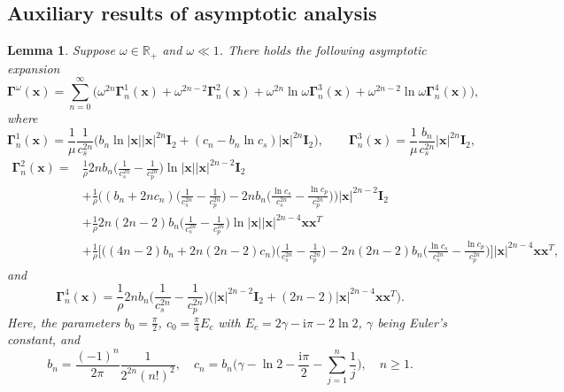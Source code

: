 \documentclass[10pt,reqno,oneside]{amsart}%
\newtheorem{lem}{Lemma}[section]
\theoremstyle{definition}
\theoremstyle{remark}
\numberwithin{equation}{section}
\numberwithin{equation}{section}
\begin{document}
\subsection{Auxiliary results of asymptotic analysis}
\begin{lem}\label{lemgamma}
Suppose $\omega\in \mathbb{R}_{+}$ and $\omega\ll1$. There holds the following asymptotic expansion%
\begin{equation}
\boldsymbol{\Gamma}^{\omega}(\mathbf{x})=\sum_{n=0}^\infty\Big(\omega^{2n}\boldsymbol{\Gamma}_{n}^{1}(\mathbf{x})
+\omega^{2n-2}\boldsymbol{\Gamma}_{n}^{2}(\mathbf{x})
+\omega^{2n}\ln{\omega}\boldsymbol{\Gamma}_{n}^{3}(\mathbf{x})
+\omega^{2n-2}\ln{\omega}\boldsymbol{\Gamma}_{n}^{4}(\mathbf{x})\Big),
\end{equation}
where
$$
\boldsymbol{\Gamma}_{n}^{1}(\mathbf{x})=\frac{1}{\mu}\frac{1}{c_{s}^{2n}}\Big(b_{n}\ln{|\mathbf{x}|}|\mathbf{x}|^{2n}\mathbf{I}_2+(c_{n}-b_{n}\ln{c_s})|\mathbf{x}|^{2n}\mathbf{I}_2\Big),
\quad\quad \boldsymbol{\Gamma}_{n}^{3}(\mathbf{x})=\frac{1}{\mu}\frac{b_{n}}{c_{s}^{2n}}|\mathbf{x}|^{2n}\mathbf{I}_2,\nonumber
$$
\begin{align}
\boldsymbol{\Gamma}_{n}^{2}(\mathbf{x})=&\frac{1}{\rho}2nb_n\big(\frac{1}{c_{s}^{2n}}-\frac{1}{c_{p}^{2n}}\big)\ln{|\mathbf{x}|}|\mathbf{x}|^{2n-2}\mathbf{I}_2\nonumber\\
&+\frac{1}{\rho}\Big((b_n+2nc_n)\big(\frac{1}{c_{s}^{2n}}-\frac{1}{c_{p}^{2n}}\big)-2nb_n\big(\frac{\ln{c_s}}{c_{s}^{2n}}-\frac{\ln{c_p}}{c_{p}^{2n}}\big)\Big)|\mathbf{x}|^{2n-2}\mathbf{I}_2\nonumber\\
&+\frac{1}{\rho}2n(2n-2)b_n\big(\frac{1}{c_{s}^{2n}}-\frac{1}{c_{p}^{2n}}\big)\ln{|\mathbf{x}|}|\mathbf{x}|^{2n-4}\mathbf{x}\mathbf{x}^T\nonumber\\
&+\frac{1}{\rho}\Big[\Big((4n-2)b_n+2n(2n-2)c_n\Big)\big(\frac{1}{c_{s}^{2n}}-\frac{1}{c_{p}^{2n}}\big)-2n(2n-2)b_n\big(\frac{\ln{c_s}}{c_{s}^{2n}}-\frac{\ln{c_p}}{c_{p}^{2n}}\big)\Big]|\mathbf{x}|^{2n-4}\mathbf{x}\mathbf{x}^T,\nonumber
\end{align}
and
$$
\boldsymbol{\Gamma}_{n}^{4}(\mathbf{x})=\frac{1}{\rho}2nb_n\big(\frac{1}{c_{s}^{2n}}-\frac{1}{c_{p}^{2n}}\big)\Big(|\mathbf{x}|^{2n-2}\mathbf{I}_2+(2n-2) |\mathbf{x}|^{2n-4}\mathbf{x}\mathbf{x}^T\Big).
$$
Here, the parameters $b_0=\frac{\pi}{2}$, $c_0=\frac{\pi}{4}E_c$ with $E_c=2\gamma -\mathrm{i}\pi-2\ln2$, $\gamma$ being Euler's constant, and
\begin{equation}\label{bncn}
b_n=\frac{(-1)^n}{2\pi}\frac{1}{2^{2n}(n!)^2},\quad c_n=b_n\big(\gamma-\ln2-\frac{\mathrm{i}\pi}{2}-\sum_{j=1}^{n}\frac{1}{j}\big), \quad n\geq 1.%
\end{equation}
\end{lem}
\end{document}
